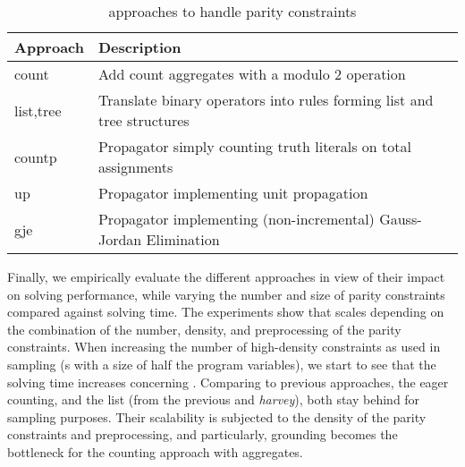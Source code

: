 \begin{table}
\begin{tabular}{ l|l }
  Approach  & Description  \\
  \hline\hline
  count     & Add count aggregates with a modulo 2 operation  \\  
  list,tree & Translate binary \XOR{} operators into rules forming list and tree structures \\
  countp    & Propagator simply counting truth literals on total assignments\\
  up        & Propagator implementing unit propagation\\
  gje       & Propagator implementing (non-incremental) Gauss-Jordan Elimination

\end{tabular}
\caption{\xorro{} approaches to handle parity constraints}\label{table:xorro_approaches}
\vspace{-7mm}
\end{table}
%
Finally, we empirically evaluate the different approaches in view of their impact on solving performance,
while varying the number and size of parity constraints compared against \clingo{} solving time.
%
The experiments show that \xorro{} scales depending on the combination of the number, density, and preprocessing of the parity constraints.
%
When increasing the number of high-density constraints as used in sampling (\XOR{}s with a size of half the program variables), we start to see that the solving time increases concerning \clingo.
%
Comparing to previous approaches, the eager counting, and the list (from the previous \xorro{} and \emph{harvey}), both stay behind for sampling purposes. Their scalability is subjected to the density of the parity constraints and preprocessing, and particularly, grounding becomes the bottleneck for the counting approach with aggregates.

%

%


